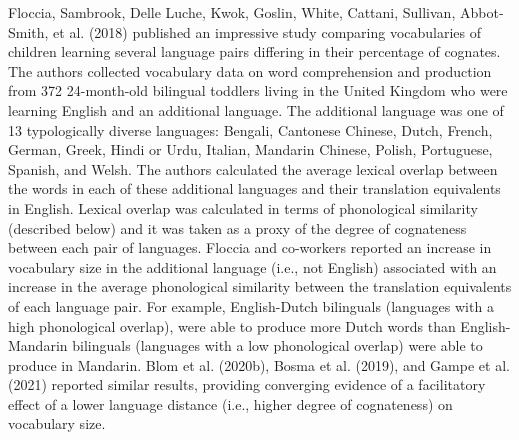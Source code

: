 \documentclass[
  12pt,
  b5paperpaper,
  twoside]{scrreprt}
\begin{document}
Floccia, Sambrook, Delle Luche, Kwok, Goslin, White, Cattani, Sullivan,
Abbot‐Smith, et al. (2018) published an impressive study comparing
vocabularies of children learning several language pairs differing in
their percentage of cognates. The authors collected vocabulary data on
word comprehension and production from 372 24-month-old bilingual
toddlers living in the United Kingdom who were learning English and an
additional language. The additional language was one of 13 typologically
diverse languages: Bengali, Cantonese Chinese, Dutch, French, German,
Greek, Hindi or Urdu, Italian, Mandarin Chinese, Polish, Portuguese,
Spanish, and Welsh. The authors calculated the average lexical overlap
between the words in each of these additional languages and their
translation equivalents in English. Lexical overlap was calculated in
terms of phonological similarity (described below) and it was taken as a
proxy of the degree of cognateness between each pair of languages.
Floccia and co-workers reported an increase in vocabulary size in the
additional language (i.e., not English) associated with an increase in
the average phonological similarity between the translation equivalents
of each language pair. For example, English-Dutch bilinguals (languages
with a high phonological overlap), were able to produce more Dutch words
than English-Mandarin bilinguals (languages with a low phonological
overlap) were able to produce in Mandarin. Blom et al. (2020b), Bosma et
al. (2019), and Gampe et al. (2021) reported similar results, providing
converging evidence of a facilitatory effect of a lower language
distance (i.e., higher degree of cognateness) on vocabulary size.
\end{document}
